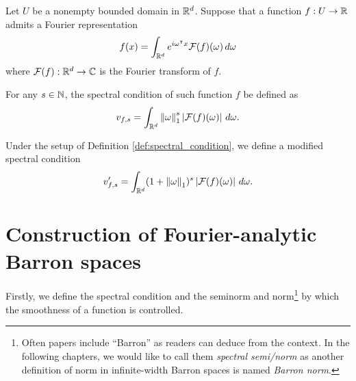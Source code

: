 \begin{definition}
    \label{def:spectral_condition}
    Let $U$ be a nonempty bounded domain in $\mathbb{R}^d$.
    Suppose that a function $f: U \to \mathbb{R}$ admits a Fourier representation
    \begin{equation}
        f(x) = \int_{\mathbb{R}^d} e^{i\omega{}^{\intercal} x} \mathcal{F}(f)(\omega) \,d\omega
    \end{equation}
    where $\mathcal{F}(f): \mathbb{R}^d \to \mathbb{C}$ is the Fourier transform of $f$.

    For any $s \in \mathbb{N}$, the spectral condition of such function $f$ be defined
    as
    \begin{equation}
        \label{eq:spectral_condition}
        v_{f,s} 
            = \int_{\mathbb{R}^d} \left\| \omega \right\|_1^s \left| \mathcal{F}(f)(\omega) \right|\,d\omega.
    \end{equation}
\end{definition}



\begin{definition}
    \label{def:spectral_condition_mod}
    Under the setup of Definition \ref{def:spectral_condition}, we define a
    modified spectral condition
    \begin{equation}
        \label{eq:spectral_condition_mod}
        v'_{f,s} 
            = \int_{\mathbb{R}^d} (1 + \left\| \omega \right\|_1)^s \left| \mathcal{F}(f)(\omega) \right|
            \,d\omega.
    \end{equation}
\end{definition}



\section{Construction of Fourier-analytic Barron spaces}
\label{sec:construction_of_fouier}

Firstly, we define the spectral condition and the seminorm and norm\footnote{
    Often papers include ``Barron'' as readers can deduce from the context. 
    In the following chapters, we would like to call them \textit{spectral 
    semi/norm} as another definition of norm in infinite-width Barron spaces is 
    named \textit{Barron norm}.
} by which the smoothness of a function
is controlled. 

